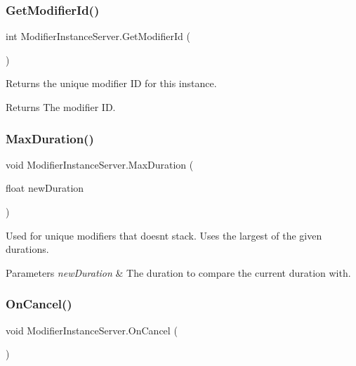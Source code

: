 \subsubsection{\texorpdfstring{Get\+Modifier\+Id()}{GetModifierId()}}
{\footnotesize\ttfamily int Modifier\+Instance\+Server.\+Get\+Modifier\+Id (\begin{DoxyParamCaption}{ }\end{DoxyParamCaption})}



Returns the unique modifier ID for this instance. 

\begin{DoxyReturn}{Returns}
The modifier ID.
\end{DoxyReturn}
\hypertarget{class_modifier_instance_server_abfb9cfedabb0659f8fb9c47a23fba19c}{}\label{class_modifier_instance_server_abfb9cfedabb0659f8fb9c47a23fba19c} 
\subsubsection{\texorpdfstring{Max\+Duration()}{MaxDuration()}}
{\footnotesize\ttfamily void Modifier\+Instance\+Server.\+Max\+Duration (\begin{DoxyParamCaption}\item[{float}]{new\+Duration }\end{DoxyParamCaption})}



Used for unique modifiers that doesn\textquotesingle{}t stack. Uses the largest of the given durations. 


\begin{DoxyParams}{Parameters}
{\em new\+Duration} & The duration to compare the current duration with.\\
\hline
\end{DoxyParams}
\hypertarget{class_modifier_instance_server_a2057c55beeaae1d267f1a331ba89a093}{}\label{class_modifier_instance_server_a2057c55beeaae1d267f1a331ba89a093} 
\subsubsection{\texorpdfstring{On\+Cancel()}{OnCancel()}}
{\footnotesize\ttfamily void Modifier\+Instance\+Server.\+On\+Cancel (\begin{DoxyParamCaption}{ }\end{DoxyParamCaption})}



